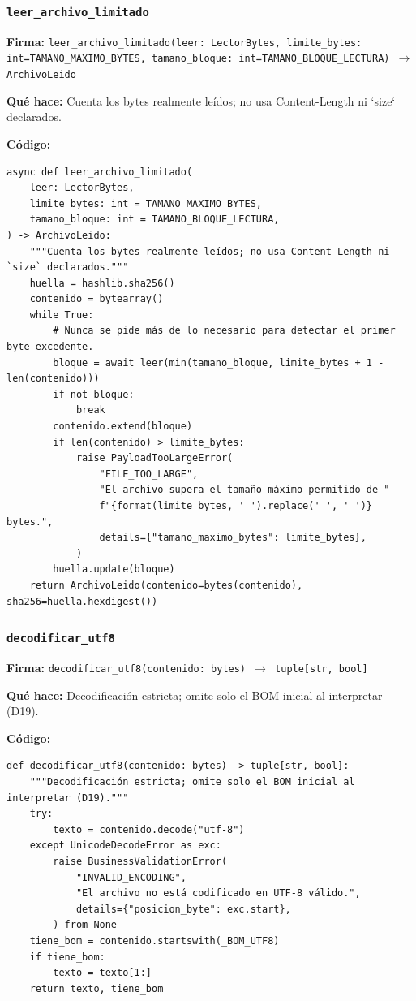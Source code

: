\documentclass[11pt,a4paper]{article}
\begin{document}
\subsubsection*{\texttt{leer\_archivo\_limitado}}
\textbf{Firma:} \texttt{leer\_archivo\_limitado(leer: LectorBytes, limite\_bytes: int=TAMANO\_MAXIMO\_BYTES, tamano\_bloque: int=TAMANO\_BLOQUE\_LECTURA) $\rightarrow$ ArchivoLeido}

\textbf{Qué hace:} Cuenta los bytes realmente leídos; no usa Content-Length ni `size` declarados.

\textbf{Código:}
\begin{lstlisting}
async def leer_archivo_limitado(
    leer: LectorBytes,
    limite_bytes: int = TAMANO_MAXIMO_BYTES,
    tamano_bloque: int = TAMANO_BLOQUE_LECTURA,
) -> ArchivoLeido:
    """Cuenta los bytes realmente leídos; no usa Content-Length ni `size` declarados."""
    huella = hashlib.sha256()
    contenido = bytearray()
    while True:
        # Nunca se pide más de lo necesario para detectar el primer byte excedente.
        bloque = await leer(min(tamano_bloque, limite_bytes + 1 - len(contenido)))
        if not bloque:
            break
        contenido.extend(bloque)
        if len(contenido) > limite_bytes:
            raise PayloadTooLargeError(
                "FILE_TOO_LARGE",
                "El archivo supera el tamaño máximo permitido de "
                f"{format(limite_bytes, '_').replace('_', ' ')} bytes.",
                details={"tamano_maximo_bytes": limite_bytes},
            )
        huella.update(bloque)
    return ArchivoLeido(contenido=bytes(contenido), sha256=huella.hexdigest())
\end{lstlisting}

\subsubsection*{\texttt{decodificar\_utf8}}
\textbf{Firma:} \texttt{decodificar\_utf8(contenido: bytes) $\rightarrow$ tuple[str, bool]}

\textbf{Qué hace:} Decodificación estricta; omite solo el BOM inicial al interpretar (D19).

\textbf{Código:}
\begin{lstlisting}
def decodificar_utf8(contenido: bytes) -> tuple[str, bool]:
    """Decodificación estricta; omite solo el BOM inicial al interpretar (D19)."""
    try:
        texto = contenido.decode("utf-8")
    except UnicodeDecodeError as exc:
        raise BusinessValidationError(
            "INVALID_ENCODING",
            "El archivo no está codificado en UTF-8 válido.",
            details={"posicion_byte": exc.start},
        ) from None
    tiene_bom = contenido.startswith(_BOM_UTF8)
    if tiene_bom:
        texto = texto[1:]
    return texto, tiene_bom
\end{lstlisting}
\end{document}
